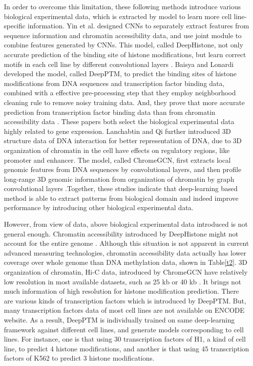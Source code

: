 In order to overcome this limitation, these following methods introduce various biological experimental data, which is extracted by model to learn more cell line-specific information. Yin et al. designed CNNs to separately extract features from sequence information and chromatin accessibility data, and use joint module to combine features generated by CNNs. This model, called DeepHistone, not only accurate prediction of the binding site of histone modifications, but learn correct motifs in each cell line by different convolutional layers \cite{yin2019deephistone}. Baisya and Lonardi developed the model, called DeepPTM, to predict the binding sites of histone modifications from DNA sequences and transcription factor binding data, combined with a effective pre-processing step that they employ neighborhood cleaning rule to remove noisy training data. And, they prove that more accurate prediction from transcription factor binding data than from chromatin accessibility data \cite{baisya2020prediction}. These papers both select the biological experimental data highly related to gene expression. Lanchabtin and Qi further introduced 3D structure data of DNA interaction for better representation of DNA, due to 3D organization of chromatin in the cell have effects on regulatory regions, like promoter and enhancer. The model, called ChromeGCN, first extracts local genomic features from DNA sequences by convolutional layers, and then profile long-range 3D genomic information from organization of chromatin by graph convolutional layers \cite{lanchantin2020graph}.Together, these studies indicate that deep-learning based method is able to extract patterns from biological domain and indeed improve performance by introducing other biological experimental data.

However, from view of data, above biological experimental data introduced is not general enough. Chromatin accessibility introduced by DeepHistone might not account for the entire genome \cite{yan2016genome}. Although this situation is not apparent in current advanced measuring technologies, chromatin accessibility data actually has lower coverage over whole genome than DNA methylation data, shown in Table\ref{t2}. 3D organization of chromatin, Hi-C data, introduced by ChromeGCN have relatively low resolution in most available datasets, such as 25 kb or 40 kb \cite{zhang2018enhancing}. It brings not much information of high resolution for histone modification prediction. There are various kinds of transcription factors which is introduced by DeepPTM. But, many transcription factors data of most cell lines are not available on ENCODE website. As a result, DeepPTM is individually trained on same deep-learning framework against different cell lines, and generate models corresponding to cell lines. For instance, one is that using 30 transcription factors of H1, a kind of cell line, to predict 4 histone modifications, and another is that using 45 transcription factors of K562 to predict 3 histone modifications.

